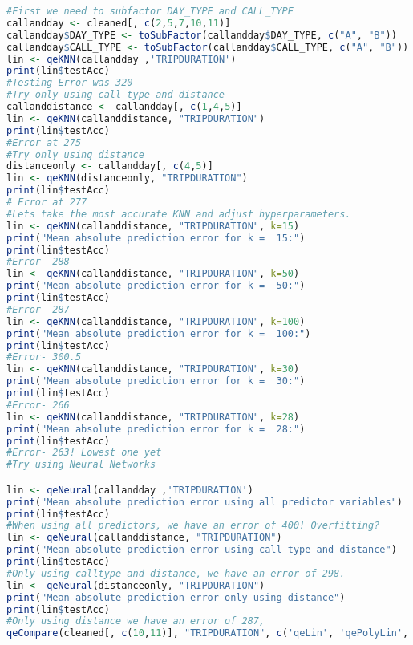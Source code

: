 \documentclass{article}
\begin{document}
\begin{lstlisting}[language=R]
#First we need to subfactor DAY_TYPE and CALL_TYPE
callandday <- cleaned[, c(2,5,7,10,11)]
callandday$DAY_TYPE <- toSubFactor(callandday$DAY_TYPE, c("A", "B"))
callandday$CALL_TYPE <- toSubFactor(callandday$CALL_TYPE, c("A", "B"))
lin <- qeKNN(callandday ,'TRIPDURATION')
print(lin$testAcc)
#Testing Error was 320
#Try only using call type and distance
callanddistance <- callandday[, c(1,4,5)]
lin <- qeKNN(callanddistance, "TRIPDURATION")
print(lin$testAcc)
#Error at 275
#Try only using distance
distanceonly <- callandday[, c(4,5)]
lin <- qeKNN(distanceonly, "TRIPDURATION")
print(lin$testAcc)
# Error at 277
#Lets take the most accurate KNN and adjust hyperparameters.
lin <- qeKNN(callanddistance, "TRIPDURATION", k=15)
print("Mean absolute prediction error for k =  15:")
print(lin$testAcc)
#Error- 288
lin <- qeKNN(callanddistance, "TRIPDURATION", k=50)
print("Mean absolute prediction error for k =  50:")
print(lin$testAcc)
#Error- 287
lin <- qeKNN(callanddistance, "TRIPDURATION", k=100)
print("Mean absolute prediction error for k =  100:")
print(lin$testAcc)
#Error- 300.5
lin <- qeKNN(callanddistance, "TRIPDURATION", k=30)
print("Mean absolute prediction error for k =  30:")
print(lin$testAcc)
#Error- 266
lin <- qeKNN(callanddistance, "TRIPDURATION", k=28)
print("Mean absolute prediction error for k =  28:")
print(lin$testAcc)
#Error- 263! Lowest one yet
#Try using Neural Networks

lin <- qeNeural(callandday ,'TRIPDURATION')
print("Mean absolute prediction error using all predictor variables")
print(lin$testAcc)
#When using all predictors, we have an error of 400! Overfitting?
lin <- qeNeural(callanddistance, "TRIPDURATION")
print("Mean absolute prediction error using call type and distance")
print(lin$testAcc)
#Only using calltype and distance, we have an error of 298.
lin <- qeNeural(distanceonly, "TRIPDURATION")
print("Mean absolute prediction error only using distance")
print(lin$testAcc)
#Only using distance we have an error of 287,
qeCompare(cleaned[, c(10,11)], "TRIPDURATION", c('qeLin', 'qePolyLin', 'qeKNN', 'qeNeural'), 25 )
\end{lstlisting}
\end{document}
